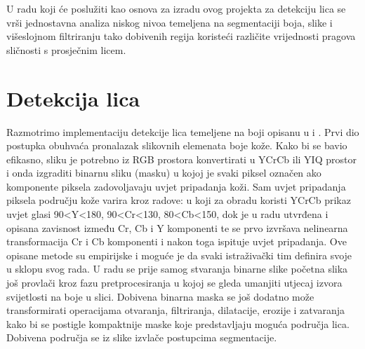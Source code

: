 \documentclass[times, utf8, seminar, numeric]{fer}
\begin{document}
U radu koji će poslužiti kao osnova za izradu ovog projekta \cite{conf/isda/ChandrappaR12} za detekciju lica se vrši jednostavna analiza niskog nivoa temeljena na segmentaciji boja, slike i višeslojnom filtriranju tako dobivenih regija koristeći različite vrijednosti pragova sličnosti s prosječnim licem.

\section{Detekcija lica}
\label{sec:predlozeno_detekcija}

Razmotrimo implementaciju detekcije lica temeljene na boji opisanu u \cite{Senior:2002:FDC:513073.513082} i \cite{conf/isda/ChandrappaR12}. Prvi dio postupka obuhvaća pronalazak slikovnih elemenata boje kože. Kako bi se bavio efikasno, sliku je potrebno iz RGB prostora konvertirati u YCrCb ili YIQ prostor i onda izgraditi binarnu sliku (masku) u kojoj je svaki piksel označen ako komponente piksela zadovoljavaju uvjet pripadanja koži. Sam uvjet pripadanja piksela području kože varira kroz radove: u \cite{rahman_face_det_gender_svm} koji za obradu koristi YCrCb prikaz uvjet glasi 90<Y<180, 90<Cr<130, 80<Cb<150, dok je u radu \cite{Senior:2002:FDC:513073.513082} utvrđena i opisana zavisnost između Cr, Cb i Y komponenti te se prvo izvršava nelinearna transformacija Cr i Cb komponenti i nakon toga ispituje uvjet pripadanja. Ove opisane metode su empirijske i moguće je da svaki istraživački tim definira svoje u sklopu svog rada. U radu \cite{Senior:2002:FDC:513073.513082} se prije samog stvaranja binarne slike početna slika još provlači kroz fazu pretprocesiranja u kojoj se gleda umanjiti utjecaj izvora svijetlosti na boje u slici. Dobivena binarna maska se  još dodatno može transformirati operacijama otvaranja, filtriranja, dilatacije, erozije i zatvaranja kako bi se postigle kompaktnije maske koje predstavljaju moguća područja lica. Dobivena područja se iz slike izvlače postupcima segmentacije.
\end{document}
